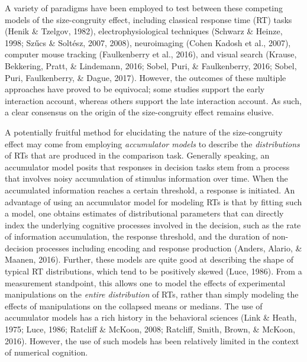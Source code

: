 \documentclass[english,,man]{apa6}
\theoremstyle{definition}
\theoremstyle{definition}
\theoremstyle{definition}
\theoremstyle{remark}
\begin{document}
A variety of paradigms have been employed to test between these
competing models of the size-congruity effect, including classical
response time (RT) tasks (Henik \& Tzelgov, 1982), electrophysiological
techniques (Schwarz \& Heinze, 1998; Szűcs \& Soltész, 2007, 2008),
neuroimaging (Cohen Kadosh et al., 2007), computer mouse tracking
(Faulkenberry et al., 2016), and visual search (Krause, Bekkering,
Pratt, \& Lindemann, 2016; Sobel, Puri, \& Faulkenberry, 2016; Sobel,
Puri, Faulkenberry, \& Dague, 2017). However, the outcomes of these
multiple approaches have proved to be equivocal; some studies support
the early interaction account, whereas others support the late
interaction account. As such, a clear consensus on the origin of the
size-congruity effect remains elusive.

A potentially fruitful method for elucidating the nature of the
size-congruity effect may come from employing \emph{accumulator models}
to describe the \emph{distributions} of RTs that are produced in the
comparison task. Generally speaking, an accumulator model posits that
responses in decision tasks stem from a process that involves noisy
accumulation of stimulus information over time. When the accumulated
information reaches a certain threshold, a response is initiated. An
advantage of using an accumulator model for modeling RTs is that by
fitting such a model, one obtains estimates of distributional parameters
that can directly index the underlying cognitive processes involved in
the decision, such as the rate of information accumulation, the response
threshold, and the duration of non-decision processes including encoding
and response production (Anders, Alario, \& Maanen, 2016). Further,
these models are quite good at describing the shape of typical RT
distributions, which tend to be positively skewed (Luce, 1986). From a
measurement standpoint, this allows one to model the effects of
experimental manipulations on the \emph{entire distribution} of RTs,
rather than simply modeling the effects of manipulations on the
collapsed means or medians. The use of accumulator models has a rich
history in the behavioral sciences (Link \& Heath, 1975; Luce, 1986;
Ratcliff \& McKoon, 2008; Ratcliff, Smith, Brown, \& McKoon, 2016).
However, the use of such models has been relatively limited in the
context of numerical cognition.
\end{document}
